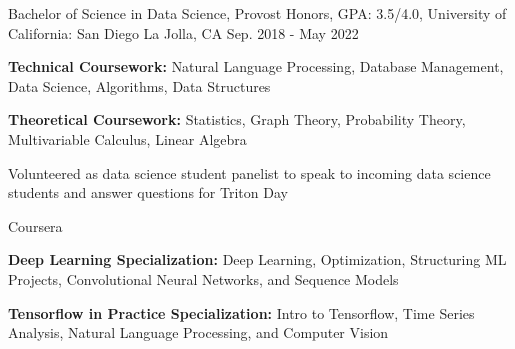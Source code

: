 
\begin{cventries}
  \cventry
    {Bachelor of Science in Data Science, Provost Honors, GPA: 3.5/4.0,} %
    {University of California: San Diego} %
    {La Jolla, CA} %
    {Sep. 2018 - May 2022} %
    {
      \begin{cvitems} %
         \item {\textbf{Technical Coursework:} {Natural Language Processing, Database Management, Data Science, Algorithms, Data Structures}}
         \item {\textbf{Theoretical Coursework:} {Statistics, Graph Theory, Probability Theory, Multivariable Calculus, Linear Algebra}}
         \item{Volunteered as data science student panelist to speak to incoming data science students and answer questions for Triton Day}
      \end{cvitems}
    }
    
  \cventry
    {} %
    {Coursera} %
    {} %
    {} %
    {
      \begin{cvitems} %
         \item {\textbf{Deep Learning Specialization:} {Deep Learning, Optimization, Structuring ML Projects, Convolutional Neural Networks, and Sequence Models}}
          \item {\textbf{Tensorflow in Practice Specialization:} {Intro to Tensorflow, Time Series Analysis, Natural Language Processing, and Computer Vision}}
      \end{cvitems}
    }
\end{cventries}
